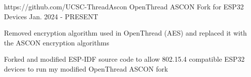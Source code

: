
\begin{cventries}
  \cventry
    {https://github.com/UCSC-ThreadAscon} %
    {OpenThread ASCON Fork for ESP32 Devices} %
    {} %
    {Jan. 2024 - PRESENT} %
    {
      \begin{cvitems} %
        \item{Removed encryption algorithm used in OpenThread (AES) and replaced it with the ASCON
              encryption algorithms}
        \item{Forked and modified ESP-IDF source code to allow 802.15.4 compatible ESP32 devices to run my
              modified OpenThread ASCON fork}
      \end{cvitems}
    }
\end{cventries}